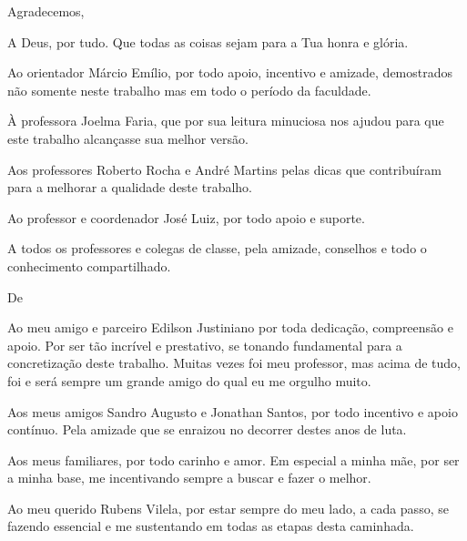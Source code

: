\begin{agradecimentos}

Agradecemos,
\newline

\par A Deus, por tudo. Que todas as coisas sejam para a Tua honra e glória.

\par Ao orientador Márcio Emílio, por todo apoio, incentivo e amizade, demostrados não somente neste trabalho mas em todo o período da faculdade.

\par À professora Joelma Faria, que por sua leitura minuciosa nos ajudou para que este trabalho alcançasse sua melhor versão.

\par Aos professores Roberto Rocha e André Martins pelas dicas que contribuíram para a melhorar a qualidade deste trabalho.

\par Ao professor e coordenador José Luiz, por todo apoio e suporte.

\par A todos os professores e colegas de classe, pela amizade, conselhos e todo o conhecimento compartilhado.

\vspace*{\fill}
De \imprimirAutorUm
\newline

\par Ao meu amigo e parceiro Edilson Justiniano por toda dedicação, compreensão e apoio. Por ser tão incrível e prestativo, se tonando fundamental para a concretização deste trabalho. Muitas vezes foi meu professor, mas acima de tudo, foi e será sempre um grande amigo do qual eu me orgulho muito.

\par Aos meus amigos Sandro Augusto e Jonathan Santos, por todo incentivo e apoio contínuo. Pela amizade que se enraizou no decorrer destes anos de luta.

\par Aos meus familiares, por todo carinho e amor. Em especial a minha mãe, por ser a minha base, me incentivando sempre a buscar e fazer o melhor. 

\par Ao meu querido Rubens Vilela, por estar sempre do meu lado, a cada passo, se fazendo essencial e me sustentando em todas as etapas desta caminhada.


\end{agradecimentos}
